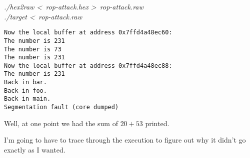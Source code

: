 \documentclass{article}
\begin{document}
\textit{
./hex2raw \textless\ rop-attack.hex \textgreater\ rop-attack.raw \\
./target \textless\ rop-attack.raw \\
}
\begin{verbatim}
Now the local buffer at address 0x7ffd4a48ec60:
The number is 231
The number is 73
The number is 231
Now the local buffer at address 0x7ffd4a48ec88:
The number is 231
Back in bar.
Back in foo.
Back in main.
Segmentation fault (core dumped)
\end{verbatim}

Well, at one point we had the sum of $20+53$ printed.

I'm going to have to trace through the execution to figure out why it didn't go exactly as I wanted.
\end{document}
